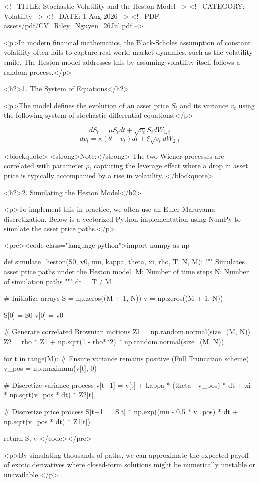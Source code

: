 <!-- TITLE: Stochastic Volatility and the Heston Model -->
<!-- CATEGORY: Volatility -->
<!-- DATE: 1 Aug 2026 -->
<!-- PDF: assets/pdf/CV_Riley_Nguyen_26Jul.pdf -->

<p>In modern financial mathematics, the Black-Scholes assumption of constant volatility often fails to capture real-world market dynamics, such as the volatility smile. The Heston model addresses this by assuming volatility itself follows a random process.</p>

<h2>1. The System of Equations</h2>

<p>The model defines the evolution of an asset price $S_t$ and its variance $v_t$ using the following system of stochastic differential equations:</p>

$$ dS_t = \mu S_t dt + \sqrt{v_t} S_t dW_{1,t} $$
$$ dv_t = \kappa(\theta - v_t)dt + \xi \sqrt{v_t} dW_{2,t} $$

<blockquote>
  <strong>Note:</strong> The two Wiener processes are correlated with parameter $\rho$, capturing the leverage effect where a drop in asset price is typically accompanied by a rise in volatility.
</blockquote>

<h2>2. Simulating the Heston Model</h2>

<p>To implement this in practice, we often use an Euler-Maruyama discretization. Below is a vectorized Python implementation using NumPy to simulate the asset price paths.</p>

<pre><code class="language-python">import numpy as np

def simulate_heston(S0, v0, mu, kappa, theta, xi, rho, T, N, M):
    """
    Simulates asset price paths under the Heston model.
    M: Number of time steps
    N: Number of simulation paths
    """
    dt = T / M
    
    # Initialize arrays
    S = np.zeros((M + 1, N))
    v = np.zeros((M + 1, N))
    
    S[0] = S0
    v[0] = v0
    
    # Generate correlated Brownian motions
    Z1 = np.random.normal(size=(M, N))
    Z2 = rho * Z1 + np.sqrt(1 - rho**2) * np.random.normal(size=(M, N))
    
    for t in range(M):
        # Ensure variance remains positive (Full Truncation scheme)
        v_pos = np.maximum(v[t], 0)
        
        # Discretize variance process
        v[t+1] = v[t] + kappa * (theta - v_pos) * dt + xi * np.sqrt(v_pos * dt) * Z2[t]
        
        # Discretize price process
        S[t+1] = S[t] * np.exp((mu - 0.5 * v_pos) * dt + np.sqrt(v_pos * dt) * Z1[t])
        
    return S, v
</code></pre>

<p>By simulating thousands of paths, we can approximate the expected payoff of exotic derivatives where closed-form solutions might be numerically unstable or unavailable.</p>